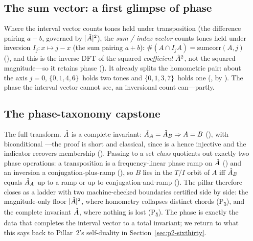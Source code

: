\subsection{The sum vector: a first glimpse of phase}\label{sec:p1-sum}


Where the interval vector counts tones held under transposition (the difference pairing $a-b$,
governed by $|\hat{A}|^2$), the \emph{sum / index vector} counts tones held under inversion
$I_j:x\mapsto j-x$ (the sum pairing $a+b$): $\#(A\cap I_jA)=\mathrm{sumcorr}(A,j)$
(), and this is the inverse DFT of the squared \emph{coefficient}
$\hat{A}^2$, not the squared magnitude---so it retains phase (). It already
splits the homometric pair: about the axis $j=0$, $\{0,1,4,6\}$\, holds
two tones and $\{0,1,3,7\}$\, holds one
(, by ). The phase the interval vector
cannot see, an inversional count can---partly.

\subsection{The phase-taxonomy capstone}\label{sec:p1-capstone}


The full transform. $\hat{A}$ is a complete invariant: $\hat{A}_A=\hat{A}_B\Rightarrow A=B$
(), with biconditional ---the proof is short and
classical, since  is a  hence injective and the indicator recovers
membership (). Passing to a set \emph{class} quotients out exactly two phase
operations: a transposition is a frequency-linear phase ramp on $\hat{A}$ ()
and an inversion a conjugation-plus-ramp (), so $B$ lies in the
$T/I$ orbit of $A$ iff $\hat{A}_B$ equals $\hat{A}_A$ up to a ramp or up to conjugation-and-ramp
(). The pillar therefore closes as a ladder with two
machine-checked boundaries certified side by side: the magnitude-only floor $|\hat{A}|^2$, where
homometry collapses distinct chords (P\textsubscript{3}), and the complete invariant $\hat{A}$, where
nothing is lost (P\textsubscript{5}). The phase is exactly the data that completes the interval
vector to a total invariant; we return to what this says back to Pillar~2's self-duality in
Section~\ref{sec:p2-sixthirty}.

